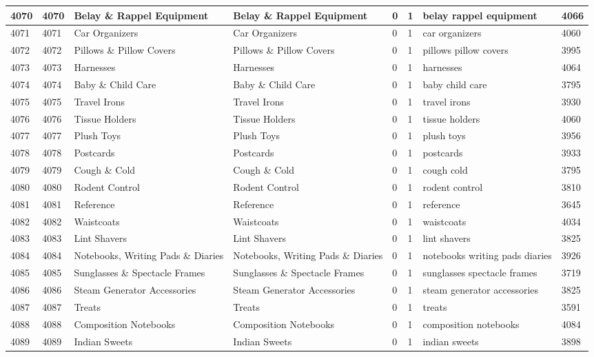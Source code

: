 \begin{longtable}{|l|l|l|l|l|l|l|l|}
4070 & 4070 & Belay \& Rappel Equipment & Belay \& Rappel Equipment & 0 & 1 & belay rappel equipment & 4066 \\ \hline 
4071 & 4071 & Car Organizers & Car Organizers & 0 & 1 & car organizers & 4060 \\ \hline 
4072 & 4072 & Pillows \& Pillow Covers & Pillows \& Pillow Covers & 0 & 1 & pillows pillow covers & 3995 \\ \hline 
4073 & 4073 & Harnesses & Harnesses & 0 & 1 & harnesses & 4064 \\ \hline 
4074 & 4074 & Baby \& Child Care & Baby \& Child Care & 0 & 1 & baby child care & 3795 \\ \hline 
4075 & 4075 & Travel Irons & Travel Irons & 0 & 1 & travel irons & 3930 \\ \hline 
4076 & 4076 & Tissue Holders & Tissue Holders & 0 & 1 & tissue holders & 4060 \\ \hline 
4077 & 4077 & Plush Toys & Plush Toys & 0 & 1 & plush toys & 3956 \\ \hline 
4078 & 4078 & Postcards & Postcards & 0 & 1 & postcards & 3933 \\ \hline 
4079 & 4079 & Cough \& Cold & Cough \& Cold & 0 & 1 & cough cold & 3795 \\ \hline 
4080 & 4080 & Rodent Control & Rodent Control & 0 & 1 & rodent control & 3810 \\ \hline 
4081 & 4081 & Reference & Reference & 0 & 1 & reference & 3645 \\ \hline 
4082 & 4082 & Waistcoats & Waistcoats & 0 & 1 & waistcoats & 4034 \\ \hline 
4083 & 4083 & Lint Shavers & Lint Shavers & 0 & 1 & lint shavers & 3825 \\ \hline 
4084 & 4084 & Notebooks, Writing Pads \& Diaries & Notebooks, Writing Pads \& Diaries & 0 & 1 & notebooks writing pads diaries & 3926 \\ \hline 
4085 & 4085 & Sunglasses \& Spectacle Frames & Sunglasses \& Spectacle Frames & 0 & 1 & sunglasses spectacle frames & 3719 \\ \hline 
4086 & 4086 & Steam Generator Accessories & Steam Generator Accessories & 0 & 1 & steam generator accessories & 3825 \\ \hline 
4087 & 4087 & Treats & Treats & 0 & 1 & treats & 3591 \\ \hline 
4088 & 4088 & Composition Notebooks & Composition Notebooks & 0 & 1 & composition notebooks & 4084 \\ \hline 
4089 & 4089 & Indian Sweets & Indian Sweets & 0 & 1 & indian sweets & 3898 \\ \hline 

\end{longtable}
